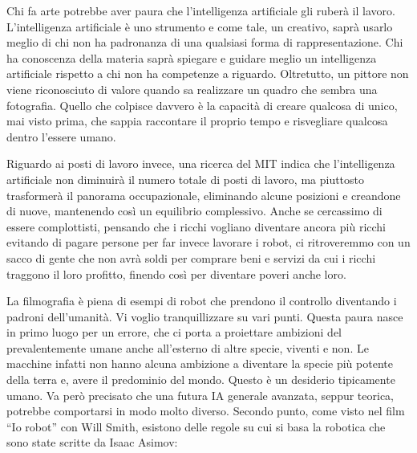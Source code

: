 \documentclass[12pt]{book} %
\begin{document}
Chi fa arte potrebbe aver paura che l'intelligenza artificiale gli ruberà il lavoro. L'intelligenza artificiale è uno strumento e come tale, un creativo, saprà usarlo meglio di chi non ha padronanza di una qualsiasi forma di rappresentazione. Chi ha conoscenza della materia saprà spiegare e guidare meglio un intelligenza artificiale rispetto a chi non ha competenze a riguardo. Oltretutto, un pittore non viene riconosciuto di valore quando sa realizzare un quadro che sembra una fotografia. Quello che colpisce davvero è la capacità di creare qualcosa di unico, mai visto prima, che sappia raccontare il proprio tempo e risvegliare qualcosa dentro l'essere umano.

Riguardo ai posti di lavoro invece, una ricerca del MIT indica che l'intelligenza artificiale non diminuirà il numero totale di posti di lavoro, ma piuttosto trasformerà il panorama occupazionale, eliminando alcune posizioni e creandone di nuove, mantenendo così un equilibrio complessivo.
Anche se cercassimo di essere complottisti, pensando che i ricchi vogliano diventare ancora più ricchi evitando di pagare persone per far invece lavorare i robot, ci ritroveremmo con un sacco di gente che non avrà soldi per comprare beni e servizi da cui i ricchi traggono il loro profitto, finendo così per diventare poveri anche loro.

La filmografia è piena di esempi di robot che prendono il controllo
diventando i padroni dell'umanità. Vi voglio tranquillizzare su vari punti. Questa paura nasce in
primo luogo per un errore, che ci porta a proiettare ambizioni del prevalentemente umane anche all'esterno
di altre specie, viventi e non. Le macchine infatti non hanno alcuna ambizione a diventare la specie più potente della
terra e, avere il predominio del mondo. Questo è un desiderio tipicamente umano. 
Va però precisato che una futura IA generale avanzata, seppur teorica, potrebbe comportarsi in modo molto diverso.
Secondo punto, come visto nel film “Io
robot” con Will Smith, esistono delle regole su cui si basa la robotica che sono state scritte da Isaac Asimov:
\end{document}
